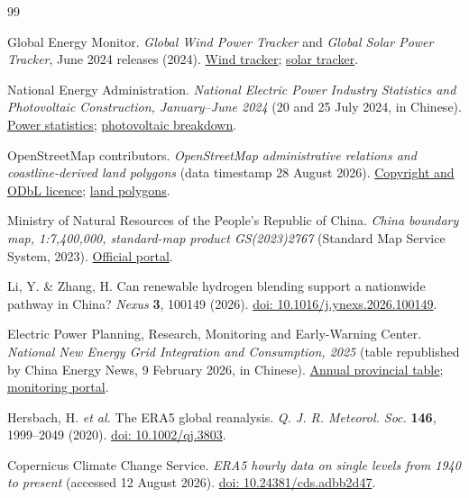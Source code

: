 \documentclass[11pt,a4paper]{article}
\begin{document}
\begin{thebibliography}{99}

Global Energy Monitor. \emph{Global Wind Power Tracker} and \emph{Global Solar Power Tracker}, June 2024 releases (2024). \href{https://globalenergymonitor.org/projects/global-wind-power-tracker/}{Wind tracker}; \href{https://globalenergymonitor.org/projects/global-solar-power-tracker/}{solar tracker}.

National Energy Administration. \emph{National Electric Power Industry Statistics and Photovoltaic Construction, January--June 2024} (20 and 25 July 2024, in Chinese). \href{https://www.nea.gov.cn/2024-07/20/c_1310782235.htm}{Power statistics}; \href{https://www.nea.gov.cn/2024-07/25/c_1310782757.htm}{photovoltaic breakdown}.

OpenStreetMap contributors. \emph{OpenStreetMap administrative relations and coastline-derived land polygons} (data timestamp 28 August 2026). \href{https://www.openstreetmap.org/copyright}{Copyright and ODbL licence}; \href{https://osmdata.openstreetmap.de/data/land-polygons.html}{land polygons}.

Ministry of Natural Resources of the People's Republic of China. \emph{China boundary map, 1:7,400,000, standard-map product GS(2023)2767} (Standard Map Service System, 2023). \href{http://bzdt.ch.mnr.gov.cn/}{Official portal}.

Li, Y. \& Zhang, H. Can renewable hydrogen blending support a nationwide pathway in China? \emph{Nexus} \textbf{3}, 100149 (2026). \href{https://doi.org/10.1016/j.ynexs.2026.100149}{doi: 10.1016/j.ynexs.2026.100149}.

Electric Power Planning, Research, Monitoring and Early-Warning Center. \emph{National New Energy Grid Integration and Consumption, 2025} (table republished by China Energy News, 9 February 2026, in Chinese). \href{https://epaper.ceic.com/pad/content/202602/09/content_20205.html}{Annual provincial table}; \href{https://www.xnyxnyj.cn/}{monitoring portal}.

Hersbach, H. \emph{et al.} The ERA5 global reanalysis. \emph{Q. J. R. Meteorol. Soc.} \textbf{146}, 1999--2049 (2020). \href{https://doi.org/10.1002/qj.3803}{doi: 10.1002/qj.3803}.

Copernicus Climate Change Service. \emph{ERA5 hourly data on single levels from 1940 to present} (accessed 12 August 2026). \href{https://doi.org/10.24381/cds.adbb2d47}{doi: 10.24381/cds.adbb2d47}.


\end{thebibliography}
\end{document}
